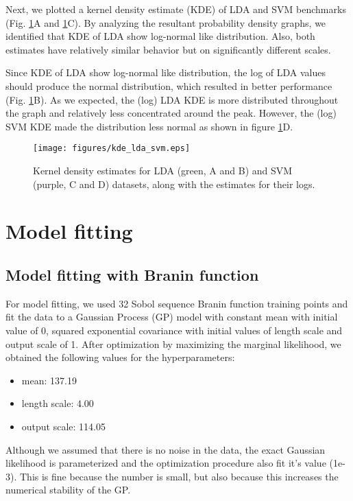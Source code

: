 \documentclass[11pt]{article}
\numberwithin{equation}{section}
\begin{document}
Next, we plotted a kernel density estimate (KDE) of LDA and SVM benchmarks
(Fig. \ref{fig:kde-lda-svm}A and \ref{fig:kde-lda-svm}C). By analyzing the
resultant probability density graphs, we identified that KDE of LDA show
log-normal like distribution. Also, both estimates have relatively similar
behavior but on significantly different scales.

Since KDE of LDA show log-normal like distribution, the log of LDA values
should produce the normal distribution, which resulted in better performance
(Fig. \ref{fig:kde-lda-svm}B). As we expected, the (log) LDA KDE is more
distributed throughout the graph and relatively less concentrated around the
peak. However, the (log) SVM KDE made the distribution less normal as shown
in figure \ref{fig:kde-lda-svm}D.

\begin{figure}[H]
  \centering
  \texttt{[image: figures/kde\_lda\_svm.eps]}
  \caption{Kernel density estimates for LDA (green, A and B) and SVM (purple, C and D) datasets, along with the estimates for their logs.}
  \label{fig:kde-lda-svm}
\end{figure}

\section{Model fitting}
\subsection*{Model fitting with Branin function}
For model fitting, we used 32 Sobol sequence Branin function training points
and fit the data to a Gaussian Process (GP) model with constant mean with
initial value of 0, squared exponential covariance with initial values of
length scale and output scale of 1. After optimization by maximizing the
marginal likelihood, we obtained the following values for the
hyperparameters:
\begin{itemize}
  \item
    mean: 137.19
  \item
    length scale: 4.00
  \item
    output scale: 114.05
\end{itemize}
Although we assumed that there is no noise in the data, the exact Gaussian likelihood is parameterized and the optimization procedure also fit it's value (1e-3). This is fine because the number is small, but also because this increases the numerical stability of the GP.
\end{document}
